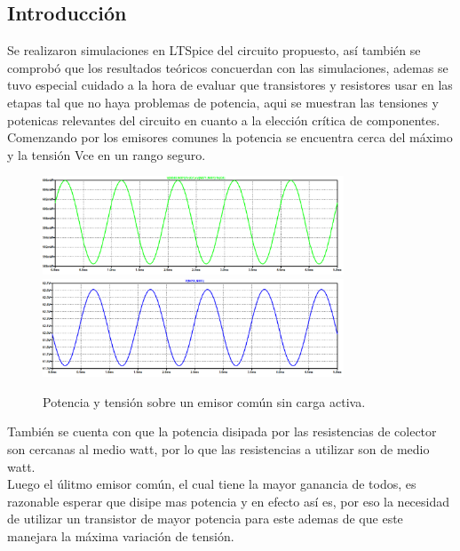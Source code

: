 




\subsection{Introducción}
Se realizaron simulaciones en LTSpice del circuito propuesto, así también se comprobó que los resultados teóricos concuerdan con las simulaciones, ademas se tuvo especial cuidado a la hora de evaluar que transistores y resistores usar en las etapas tal que no haya problemas de potencia, aqui se muestran las tensiones y potenicas relevantes del circuito en cuanto a la elección crítica de componentes.\\
Comenzando por los emisores comunes la potencia se encuentra cerca del máximo y la tensión Vce en un rango seguro.

\begin{figure}[H]
	\centering
	\includegraphics[width=0.8\textwidth]{ImagenesSimulaciones/PEC1.png}
		\includegraphics[width=0.8\textwidth]{ImagenesSimulaciones/VEC1.png}
	\caption{Potencia y tensión sobre un emisor común sin carga activa.}
	\label{fig:pec1}
\end{figure}También se cuenta con que la potencia disipada por las resistencias de colector son cercanas al medio watt, por lo que las resistencias a utilizar son de medio watt.\\
Luego el úlitmo emisor común, el cual tiene la mayor ganancia de todos, es razonable esperar que disipe mas potencia y en efecto así es, por eso la necesidad de utilizar un transistor de mayor potencia para este ademas de que este manejara la máxima variación de tensión.

